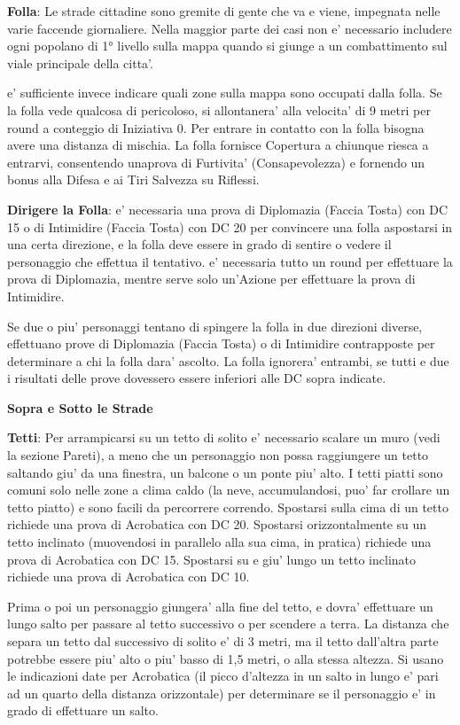\documentclass[a4paper,11pt,twoside,openany]{dndbook}
\begin{document}
\textbf{Folla}: Le strade cittadine sono gremite di gente che va e viene, impegnata nelle varie faccende giornaliere. Nella maggior parte dei casi non e' necessario includere ogni popolano di 1° livello sulla mappa quando si giunge a un combattimento sul viale principale della citta'.

e' sufficiente invece indicare quali zone sulla mappa sono occupati dalla folla. Se la folla vede qualcosa di pericoloso, si allontanera' alla velocita' di 9 metri per round a conteggio di Iniziativa 0. Per entrare in contatto con la folla bisogna avere una distanza di mischia. La folla fornisce Copertura a chiunque riesca a entrarvi, consentendo unaprova di Furtivita' (Consapevolezza) e fornendo un bonus alla Difesa e ai Tiri Salvezza su Riflessi.

\textbf{Dirigere la Folla}: e' necessaria una prova di Diplomazia (Faccia Tosta) con DC 15 o di Intimidire (Faccia Tosta) con DC 20 per convincere una folla aspostarsi in una certa direzione, e la folla deve essere in grado di sentire o vedere il personaggio che effettua il tentativo. e' necessaria tutto un round per effettuare la prova di Diplomazia, mentre serve solo un'Azione per effettuare la prova di Intimidire.

Se due o piu' personaggi tentano di spingere la folla in due direzioni diverse, effettuano prove di Diplomazia (Faccia Tosta) o di Intimidire contrapposte per determinare a chi la folla dara' ascolto. La folla ignorera' entrambi, se tutti e due i risultati delle prove dovessero essere inferiori alle DC sopra indicate.

\textbf{Sopra e Sotto le Strade}

\textbf{Tetti}: Per arrampicarsi su un tetto di solito e' necessario scalare un muro (vedi la sezione Pareti), a meno che un personaggio non possa raggiungere un tetto saltando giu' da una finestra, un balcone o un ponte piu' alto. I tetti piatti sono comuni solo nelle zone a clima caldo (la neve, accumulandosi, puo' far crollare un tetto piatto) e sono facili da percorrere correndo. Spostarsi sulla cima di un tetto richiede una prova di Acrobatica con DC 20. Spostarsi orizzontalmente su un tetto inclinato (muovendosi in parallelo alla sua cima, in pratica) richiede una prova di Acrobatica con DC 15. Spostarsi su e giu' lungo un tetto inclinato richiede una prova di Acrobatica con DC 10.

Prima o poi un personaggio giungera' alla fine del tetto, e dovra' effettuare un lungo salto per passare al tetto successivo o per scendere a terra. La distanza che separa un tetto dal successivo di solito e' di 3 metri, ma il tetto dall'altra parte potrebbe essere piu' alto o piu' basso di 1,5 metri, o alla stessa altezza. Si usano le indicazioni date per Acrobatica (il picco d'altezza in un salto in lungo e' pari ad un quarto della distanza orizzontale) per determinare se il personaggio e' in grado di effettuare un salto.
\end{document}
